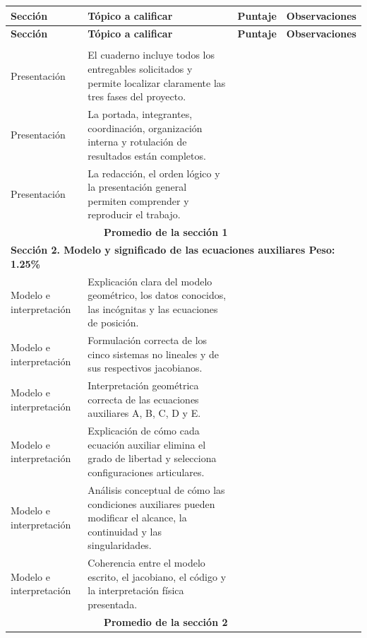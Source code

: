 \documentclass[12pt]{article}
\begin{document}
\bigskip

\setlength{\LTpre}{0pt}
\setlength{\LTpost}{0pt}
\renewcommand{\arraystretch}{1.15}
\setlength{\tabcolsep}{3pt}

{\scriptsize
\begin{longtable}{|p{3.7cm}|p{7.0cm}|>{\centering\arraybackslash}p{1cm}|p{3.0cm}|}
\hline
\textbf{Sección} & \textbf{Tópico a calificar} & \textbf{Puntaje} & \textbf{Observaciones} \\
\hline
\endfirsthead

\hline
\textbf{Sección} & \textbf{Tópico a calificar} & \textbf{Puntaje} & \textbf{Observaciones} \\
\hline
\endhead

\hline
\endfoot

\hline
\endlastfoot

\multicolumn{4}{|l|}{\textbf{Sección 1. Presentación y completitud \hfill Peso: 0.50\%}}\\
\hline
Presentación &
El cuaderno incluye todos los entregables solicitados y permite localizar claramente las tres fases del proyecto. & & \\
\hline
Presentación &
La portada, integrantes, coordinación, organización interna y rotulación de resultados están completos. & & \\
\hline
Presentación &
La redacción, el orden lógico y la presentación general permiten comprender y reproducir el trabajo. & & \\
\hline
\multicolumn{2}{|r|}{\textbf{Promedio de la sección 1}} & & \\
\hline

\multicolumn{4}{|l|}{\textbf{Sección 2. Modelo y significado de las ecuaciones auxiliares \hfill Peso: 1.25\%}}\\
\hline
Modelo e interpretación &
Explicación clara del modelo geométrico, los datos conocidos, las incógnitas y las ecuaciones de posición. & & \\
\hline
Modelo e interpretación &
Formulación correcta de los cinco sistemas no lineales y de sus respectivos jacobianos. & & \\
\hline
Modelo e interpretación &
Interpretación geométrica correcta de las ecuaciones auxiliares A, B, C, D y E. & & \\
\hline
Modelo e interpretación &
Explicación de cómo cada ecuación auxiliar elimina el grado de libertad y selecciona configuraciones articulares. & & \\
\hline
Modelo e interpretación &
Análisis conceptual de cómo las condiciones auxiliares pueden modificar el alcance, la continuidad y las singularidades. & & \\
\hline
Modelo e interpretación &
Coherencia entre el modelo escrito, el jacobiano, el código y la interpretación física presentada. & & \\
\hline
\multicolumn{2}{|r|}{\textbf{Promedio de la sección 2}} & & \\
\hline


\end{longtable}}
\end{document}

